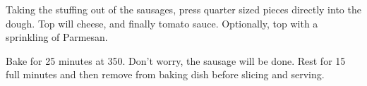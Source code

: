 \begin{recipe}

Taking the stuffing out of the sausages, press quarter sized pieces directly into the dough. Top will cheese, and finally tomato sauce. Optionally, top with a sprinkling of Parmesan.

Bake for 25 minutes at 350. Don't worry, the sausage will be done. Rest for 15 full minutes and then remove from baking dish before slicing and serving.


\end{recipe}
